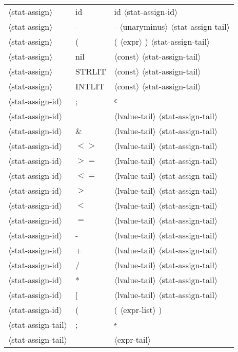 \documentclass[11pt, fleqn]{article}
\newcommand{\atag}[1]{$\langle$#1$\rangle$}
\begin{document}
\begin{longtable}{l|l|l}
\atag{stat-assign}				&	id		&	id \atag{stat-assign-id}		\\
\atag{stat-assign}				&	-		&	- \atag{unaryminus} \atag{stat-assign-tail}		\\
\atag{stat-assign}				&	(		&	( \atag{expr} ) \atag{stat-assign-tail}		\\
\atag{stat-assign}				&	nil		&	\atag{const}	 \atag{stat-assign-tail}		\\
\atag{stat-assign}				&	STRLIT		&	\atag{const}	 \atag{stat-assign-tail}		\\
\atag{stat-assign}				&	INTLIT		&	\atag{const}	 \atag{stat-assign-tail}		\\
\atag{stat-assign-id}			&	;			&	$\epsilon$			\\
\atag{stat-assign-id}			&	\textbar		&	\atag{lvalue-tail} \atag{stat-assign-tail}			\\
\atag{stat-assign-id}			&	\&			&	\atag{lvalue-tail} \atag{stat-assign-tail}			\\
\atag{stat-assign-id}			&	$<>$			&	\atag{lvalue-tail} \atag{stat-assign-tail}			\\
\atag{stat-assign-id}			&	$>=$			&	\atag{lvalue-tail} \atag{stat-assign-tail}			\\
\atag{stat-assign-id}			&	$<=$			&	\atag{lvalue-tail} \atag{stat-assign-tail}			\\
\atag{stat-assign-id}			&	$>$			&	\atag{lvalue-tail} \atag{stat-assign-tail}			\\
\atag{stat-assign-id}			&	$<$			&	\atag{lvalue-tail} \atag{stat-assign-tail}			\\
\atag{stat-assign-id}			&	$=$			&	\atag{lvalue-tail} \atag{stat-assign-tail}			\\
\atag{stat-assign-id}			&	-			&	\atag{lvalue-tail} \atag{stat-assign-tail}			\\
\atag{stat-assign-id}			&	+			&	\atag{lvalue-tail} \atag{stat-assign-tail}			\\
\atag{stat-assign-id}			&	/			&	\atag{lvalue-tail} \atag{stat-assign-tail}			\\
\atag{stat-assign-id}			&	*			&	\atag{lvalue-tail} \atag{stat-assign-tail}			\\
\atag{stat-assign-id}			&	[			&	\atag{lvalue-tail} \atag{stat-assign-tail}			\\
\atag{stat-assign-id}			&	(			&	( \atag{expr-list} )			\\
\atag{stat-assign-tail}			&	;			&	$\epsilon$	\\
\atag{stat-assign-tail}			&	\textbar		&	\atag{expr-tail}	\\

\end{longtable}
\end{document}
